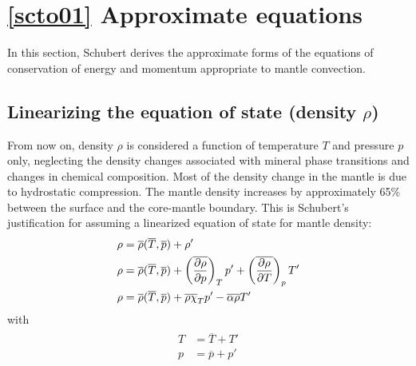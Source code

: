 \documentclass[document.tex]{subfiles}
\begin{document}
\section{\ref{scto01} Approximate equations}
In this section, Schubert derives the approximate forms of the equations of conservation
of energy and momentum appropriate to mantle convection. 

\subsection{Linearizing the equation of state (density $\rho$)}
From now on, density $\rho$ is considered a function of temperature $T$ and pressure $p$ only, neglecting the 
density changes associated with mineral phase transitions and changes in chemical composition. 
\newline
Most of the density change in the mantle is due to hydrostatic compression. The mantle density increases by approximately 
65\% between the surface and the core-mantle boundary. This is Schubert's justification for assuming a linearized equation of 
state for mantle density: 
\begin{align}
    \begin{split}
    \label{6.10.1}
    \rho &= \overline{\rho}(\overline{T}, \overline{p}) + \rho ' \\
    \rho &= \overline{\rho}(\overline{T}, \overline{p}) + \left( \overline{\pdv{\rho}{p}}\right)_T p' +
     \left( \overline{\pdv{\rho}{T}} \right)_p T'\\
    \rho &= \overline{\rho}(\overline{T}, \overline{p}) + \overline{\rho \chi}_T p' -\overline{\alpha\rho}T'\\
\end{split}
\end{align}
with 
\begin{align}
    \begin{split}
    T &= \overline{T} + T'\\
    p &= \overline{p} +p' \\
    \end{split}
\end{align}
\end{document}
